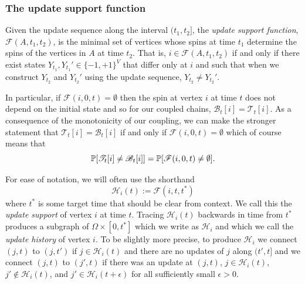 	\subsubsection{The update support function}
	\label{sec: definition update support function}
	Given the update sequence along the interval $(t_1, t_2]$, the \emph{update support function}, $\mathscr{F}(A, t_1, t_2)$, is the minimal set of vertices whose spins at time $t_1$ determine the spins of the vertices in $A$ at time $t_2$. That is, $i \in \mathscr{F}(A, t_1, t_2)$ if and only if there exist states $Y_{t_1}, Y_{t_1}' \in \{-1, +1\}^{V}$ that differ only at $i$ and such that when we construct $Y_{t_2}$ and $Y_{t_2}'$ using the update sequence, $Y_{t_2} \neq Y_{t_2}'$.

	In particular, if $\mathscr{F}(i, 0, t) = \emptyset$ then the spin at vertex $i$ at time $t$ does not depend on the initial state and so for our coupled chains, $\mathscr{B}_t[i] = \mathscr{T}_t[i]$.
	As a consequence of the monotonicity of our coupling, we can make the stronger statement that $\mathscr{T}_t[i] = \mathscr{B}_t[i]$ if and only if $\mathscr{F}(i, 0, t) = \emptyset$ which of course means that
	\begin{equation}
	\label{eq:prob equality of coupling and empty support}
		\mathbb{P}[\mathscr{T}_t[i] \neq \mathscr{B}_t[i]] = \mathbb{P}[\mathscr{F}(i, 0, t) \neq \emptyset].
	\end{equation}

	For ease of notation, we will often use the shorthand
	\begin{equation}
		\mathcal{H}_i(t) := \mathscr{F}(i, t, t^*)
	\end{equation}
	where $t^*$ is some target time that should be clear from context. We call this the \emph{update support} of vertex $i$ at time $t$. Tracing $\mathcal{H}_i(t)$ backwards in time from $t^*$ produces a subgraph of $\Omega \times [0, t^*]$ which we write as $\mathcal{H}_i$ and which we call the \emph{update history} of vertex $i$. To be slightly more precise, to produce $\mathcal{H}_i$ we connect $(j,t)$ to $(j,t')$ if $j \in \mathcal{H}_i(t)$ and there are no updates of $j$ along $(t', t]$ and we connect $(j,t)$ to $(j',t)$ if there was an update at $(j, t)$, $j \in \mathcal{H}_i(t)$, $j' \notin \mathcal{H}_i(t)$, and $j' \in \mathcal{H}_i(t+\epsilon)$ for all sufficiently small $\epsilon > 0$.

